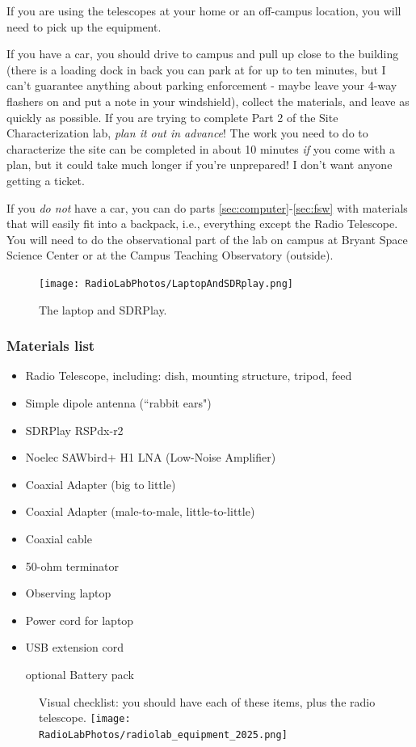 \documentclass[11pt]{article}
\begin{document}
If you are using the telescopes at your home or an off-campus location, you will need to pick up
the equipment.

If you have a car, you should drive to campus and pull up close to the building
(there is a loading dock in back you can park at for up to ten minutes, but I can't guarantee
anything about parking enforcement - maybe leave your 4-way flashers on and put a note in your windshield),
collect the materials, and leave as quickly as possible.
If you are trying to complete Part 2 of the Site Characterization lab, \emph{plan it out in advance}!
The work you need to do to characterize the site can be completed in about 10 minutes \emph{if}
you come with a plan, but it could take much longer if you're unprepared!  I don't want anyone getting a ticket.

If you \emph{do not} have a car, you can do parts \ref{sec:computer}-\ref{sec:fsw}
with materials that will easily fit into a backpack, i.e., everything except the Radio Telescope.
You will need to do the observational part of the lab on campus at Bryant Space Science Center or at
the Campus Teaching Observatory (outside).


\begin{figure}[h]
    \centering
    \texttt{[image: RadioLabPhotos/LaptopAndSDRplay.png]}
    \caption{The laptop and SDRPlay.}
\end{figure}

\clearpage
\subsubsection{Materials list}
\begin{itemize}
    \item Radio Telescope, including: dish, mounting structure, tripod, feed
    \item Simple dipole antenna (``rabbit ears")
    \item SDRPlay RSPdx-r2
    \item Noelec SAWbird+ H1 LNA (Low-Noise Amplifier)
    \item Coaxial Adapter (big to little)
    \item Coaxial Adapter (male-to-male, little-to-little)
    \item Coaxial cable
    \item 50-ohm terminator
    \item Observing laptop
    \item Power cord for laptop
    \item USB extension cord
    \item [optional] Battery pack
\end{itemize}
\begin{figure}[h]
    \centering
    Visual checklist: you should have each of these items, plus the radio telescope.
    \texttt{[image: RadioLabPhotos/radiolab\_equipment\_2025.png]}
\end{figure}
\end{document}
